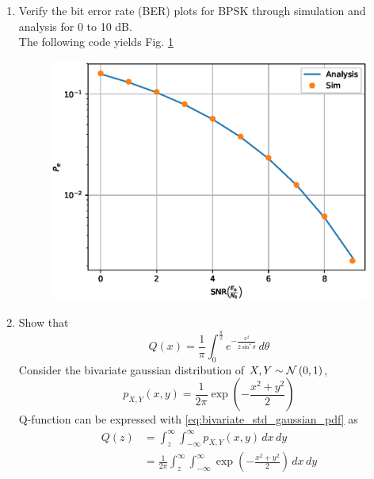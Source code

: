 \documentclass[10pt, a4paper]{article}
\begin{document}
\begin{enumerate}
\item
Verify the bit error rate (BER) plots for BPSK through simulation and analysis for 0 to 10 dB. \\
\solution
The following code yields Fig. \ref{fig:bpsk_ber}
\begin{center}
\end{center}
\begin{figure}[!h]
\centering
\includegraphics[width=\columnwidth]{images/bpsk2.eps}
\caption{}
\label{fig:bpsk_ber}
\end{figure}
\item
Show that
\begin{equation}
Q(x) = \frac{1}{\pi}\int^{\frac{\pi}{2}}_{0}e^{-\frac{x^2}{2\sin^2 \theta}}\,d\theta
\end{equation}
\solution 
\solution Consider the bivariate gaussian distribution of $X,Y \sim \mathcal{N}\left(0,1\right)$,
\begin{equation}
	p_{X,Y}(x,y) = \frac{1}{2\pi}\exp\left(-\frac{x^2+y^2}{2}\right)
	\label{eq:bivariate_std_gaussian_pdf}
\end{equation}
Q-function can be expressed with \eqref{eq:bivariate_std_gaussian_pdf} as
\begin{align}
	Q(z) &= \int_{z}^{\infty}\int_{-\infty}^{\infty} p_{X,Y}(x,y) \,dx\,dy \\
	\label{eq:qfunc_biv_integ}
	&= \frac{1}{2\pi}\int_{z}^{\infty}\int_{-\infty}^{\infty} \exp\left(-\frac{x^2+y^2}{2}\right) \,dx\,dy
\end{align}

\end{enumerate}
\end{document}
